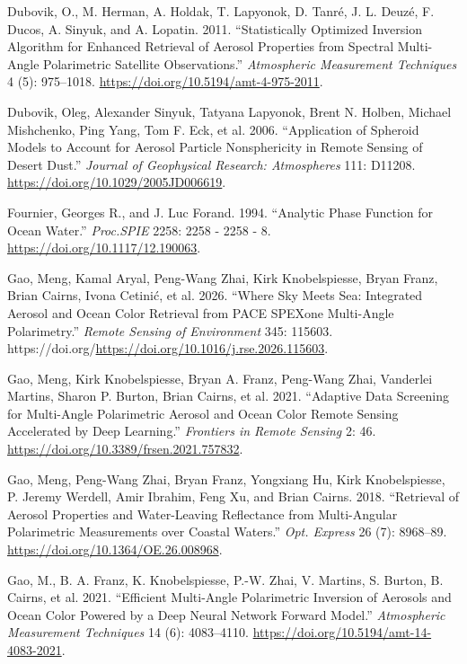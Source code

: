 \documentclass[
  letterpaper,
  open=any]{scrbook}
\newlength{\cslhangindent}
\newenvironment{CSLReferences}[2] %
 {\begin{list}{}{%
  \setlength{\itemindent}{0pt}
  \setlength{\leftmargin}{0pt}
  \setlength{\parsep}{0pt}
  \ifodd #1
   \setlength{\leftmargin}{\cslhangindent}
   \setlength{\itemindent}{-1\cslhangindent}
  \fi
  \setlength{\itemsep}{#2\baselineskip}}}
 {\end{list}}
\begin{document}
\begin{CSLReferences}{1}{0}
Dubovik, O., M. Herman, A. Holdak, T. Lapyonok, D. Tanré, J. L. Deuzé,
F. Ducos, A. Sinyuk, and A. Lopatin. 2011. {``Statistically Optimized
Inversion Algorithm for Enhanced Retrieval of Aerosol Properties from
Spectral Multi-Angle Polarimetric Satellite Observations.''}
\emph{Atmospheric Measurement Techniques} 4 (5): 975--1018.
\url{https://doi.org/10.5194/amt-4-975-2011}.

Dubovik, Oleg, Alexander Sinyuk, Tatyana Lapyonok, Brent N. Holben,
Michael Mishchenko, Ping Yang, Tom F. Eck, et al. 2006. {``Application
of Spheroid Models to Account for Aerosol Particle Nonsphericity in
Remote Sensing of Desert Dust.''} \emph{Journal of Geophysical Research:
Atmospheres} 111: D11208. \url{https://doi.org/10.1029/2005JD006619}.

Fournier, Georges R., and J. Luc Forand. 1994. {``Analytic Phase
Function for Ocean Water.''} \emph{Proc.SPIE} 2258: 2258 - 2258 - 8.
\url{https://doi.org/10.1117/12.190063}.

Gao, Meng, Kamal Aryal, Peng-Wang Zhai, Kirk Knobelspiesse, Bryan Franz,
Brian Cairns, Ivona Cetinić, et al. 2026. {``Where Sky Meets Sea:
Integrated Aerosol and Ocean Color Retrieval from PACE SPEXone
Multi-Angle Polarimetry.''} \emph{Remote Sensing of Environment} 345:
115603. https://doi.org/\url{https://doi.org/10.1016/j.rse.2026.115603}.

Gao, Meng, Kirk Knobelspiesse, Bryan A. Franz, Peng-Wang Zhai, Vanderlei
Martins, Sharon P. Burton, Brian Cairns, et al. 2021. {``Adaptive Data
Screening for Multi-Angle Polarimetric Aerosol and Ocean Color Remote
Sensing Accelerated by Deep Learning.''} \emph{Frontiers in Remote
Sensing} 2: 46. \url{https://doi.org/10.3389/frsen.2021.757832}.

Gao, Meng, Peng-Wang Zhai, Bryan Franz, Yongxiang Hu, Kirk
Knobelspiesse, P. Jeremy Werdell, Amir Ibrahim, Feng Xu, and Brian
Cairns. 2018. {``Retrieval of Aerosol Properties and Water-Leaving
Reflectance from Multi-Angular Polarimetric Measurements over Coastal
Waters.''} \emph{Opt. Express} 26 (7): 8968--89.
\url{https://doi.org/10.1364/OE.26.008968}.

Gao, M., B. A. Franz, K. Knobelspiesse, P.-W. Zhai, V. Martins, S.
Burton, B. Cairns, et al. 2021. {``Efficient Multi-Angle Polarimetric
Inversion of Aerosols and Ocean Color Powered by a Deep Neural Network
Forward Model.''} \emph{Atmospheric Measurement Techniques} 14 (6):
4083--4110. \url{https://doi.org/10.5194/amt-14-4083-2021}.


\end{CSLReferences}
\end{document}
